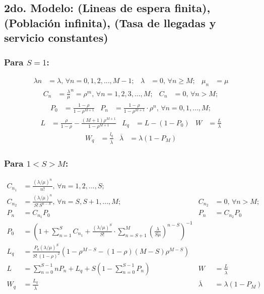 \documentclass[letterpaper, 12pt]{article}
\begin{document}
\begin{justify}
    \subsection*{2do. Modelo: (Lineas de espera finita), (Población infinita), (Tasa de llegadas y servicio constantes)}
    \subsubsection*{Para \(S=1\):}
    \large{
    \begin{align*}
\lambda n&=\lambda,\,\forall n=0,1,2,...,M-1;&\lambda&=0,\,\forall n\geq M;&\mu_n&=\mu
    \end{align*}
    }
    \large{
    \begin{align*}
C_n&=\frac{\lambda}{\mu}^n=\rho^m,\,\forall n=1,2,3,...,M;&C_n&=0,\,\forall n>M;
    \end{align*}
    }
    \large{
    \begin{align*}
P_0&=\frac{1-\rho}{1-\rho^{M+1}}&P_n&=\frac{1-\rho}{1-\rho^{M+1}}\cdot \rho^n,\,\forall n=0,1,...,M;
    \end{align*}
    }
    \large{
    \begin{align*}
L&=\frac{\rho}{1-\rho}-\frac{(M+1)\rho^{M+1}}{1-\rho^{M+1}}&L_q&=L-(1-P_0)&W&=\frac{L}{\lambda}
    \end{align*}
    }
    \large{
    \begin{align*}
W_q&=\frac{l_q}{\overline{\lambda}}&\overline{\lambda}&=\lambda(1-P_M)
    \end{align*}
    }
    \subsubsection*{Para \(1<S>M\):}
    \large{
    \begin{align*}
C_{n_1}&=\frac{(\lambda/\mu)^n}{n!},\,\forall n=1,2,...,S;\\
C_{n_2}&=\frac{(\lambda/\mu)^n}{S!\,S^{n-S}},\,\forall n=S,S+1,...,M;&C_{n_2}&=0,\,\forall n>M;\\
P_n&=C_{n_1}P_0&P_n&=C_{n_2}P_0\\
P_0&=\left(1+\sum_{n=1}^{S} C_{n_1}+\frac{(\lambda/\mu)^S}{S!}\cdot\sum_{n=S+1}^{M} \left(\frac{\lambda}{S\mu}\right)^{n-S}\right)^{-1}\\
L_q&=\frac{P_0(\lambda/\mu)^S}{S!\,(1-\rho)^2}\left(1-\rho^{M-S}-(1-\rho)(M-S)\rho^{M-S}\right)\\
L&=\sum_{n=0}^{S-1} nP_n+L_q+S\left(1-\sum_{n=0}^{S-1} P_n\right)&W&=\frac{L}{\overline{\lambda}}\\
W_q&=\frac{L_q}{\overline{\lambda}}&\overline{\lambda}&=\lambda(1-P_M)
    \end{align*}
    }

\end{justify}
\end{document}
